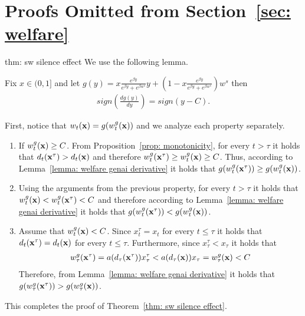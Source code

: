 \section{Proofs Omitted from Section~\ref{sec: welfare}}
\begin{proofof}{thm: sw silence effect}
We use the following lemma.

\begin{lemma} \label{lemma: welfare genai derivative}
Fix $x \in (0, 1]$ and let $g(y) = x\frac{e^{\beta y}}{e^{\beta y} + e^{\beta w^s}} y + \left(1-x\frac{e^{\beta y}}{e^{\beta y} + e^{\beta w^s}}\right) w^s$ then
\begin{align*}
sign\left(\frac{d g(y)}{dy}\right) = sign(y - C).
\end{align*}
\end{lemma}

First, notice that $w_t({\bf{x}}) = g(w^g_t({\bf{x}}))$ and we analyze each property separately. 

\begin{enumerate}
\item 
If $ w^g_t({\bf{x}}) \geq C$. From Proposition~\ref{prop: monotonicity}, for every $t > \tau$ it holds that $d_t({\bf{x}}^\tau) > d_t({\bf{x}})$ and therefore $w^g_t({\bf{x}}^\tau) \geq w^g_t({\bf{x}}) \geq C$. Thus, according to Lemma~\ref{lemma: welfare genai derivative} it holds that $g(w^g_t({\bf{x}}^\tau)) \geq g(w^g_t({\bf{x}}))$.

\item
Using the arguments from the previous property, for every $t > \tau$ it holds that $w^g_t({\bf{x}}) < w^g_t({\bf{x}}^\tau) < C$ and therefore according to Lemma~\ref{lemma: welfare genai derivative} it holds that $g(w^g_t({\bf{x}}^\tau)) < g(w^g_t({\bf{x}}))$.

\item Assume that $w^g_t({\bf{x}}) < C$. Since $x^\tau_t = x_t$ for every $t \leq \tau$ it holds that $d_t({\bf{x}}^\tau) = d_t({\bf{x}})$ for every $t \leq \tau$. Furthermore, since $x^\tau_\tau < x_\tau$ it holds that 
\begin{align*}
w^g_\tau({\bf{x}}^\tau) = a(d_\tau({\bf{x}}^\tau)) x^\tau_\tau < a(d_\tau({\bf{x}})) x_\tau = w^g_\tau({\bf{x}}) < C
\end{align*}
Therefore, from Lemma~\ref{lemma: welfare genai derivative} it holds that $g(w^g_\tau({\bf{x}}^\tau)) > g(w^g_\tau({\bf{x}}))$.
\end{enumerate}

This completes the proof of Theorem~\ref{thm: sw silence effect}.
\end{proofof}

